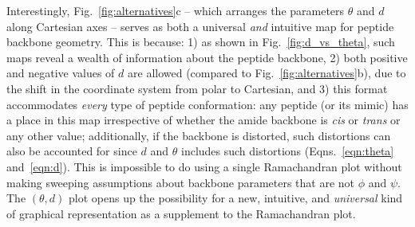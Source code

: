 \documentclass[fleqn,10pt,lineno]{wlpeerj} %
\newcommand{\Fig}[1]{Fig.~\ref{#1}}
\newcommand{\Eqns}[1]{Eqns.~\ref{#1}}
\newcommand{\cis}{{\em cis}\xspace}
\newcommand{\trans}{{\em trans}\xspace}
\begin{document}
{Interestingly, \Fig{fig:alternatives}c -- which arranges the parameters $\theta$ and $d$ along Cartesian axes -- serves as both a universal {\em and} intuitive map for peptide backbone geometry. This is because: 1) as shown in \Fig{fig:d_vs_theta}, such maps reveal a wealth of information about the peptide backbone, 2) both positive and negative values of $d$ are allowed (compared to \Fig{fig:alternatives}b), due to the shift in the coordinate system from polar to Cartesian, and 3) this format accommodates {\it every} type of peptide conformation: any peptide (or its mimic) has a place in this map irrespective of whether the amide backbone is \cis or \trans or any other value; additionally, if the backbone is distorted, such distortions can also be accounted for since $d$ and $\theta$ includes such distortions (\Eqns{eqn:theta} and~\ref{eqn:d}). This is impossible to do using a single Ramachandran plot without making sweeping assumptions about backbone parameters that are not $\phi$ and $\psi$. The $(\theta,d)$ plot opens up the possibility for a new, intuitive, and {\it universal} kind of graphical representation as a supplement to the Ramachandran plot.
}
\end{document}
